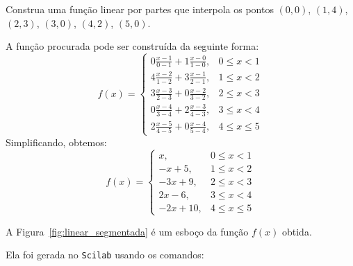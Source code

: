 \begin{ex}
  Construa uma função linear por partes que interpola os pontos $(0,0)$, $(1,4)$, $(2,3)$, $(3,0)$, $(4,2)$, $(5,0)$.

A função procurada pode ser construída da seguinte forma:
\begin{equation*}
  f(x) = \left\{
    \begin{array}{ll}
      0\frac{x-1}{0-1} + 1\frac{x-0}{1-0} ,& 0 \leq x < 1\\
      4\frac{x-2}{1-2} + 3\frac{x-1}{2-1} ,& 1 \leq x < 2\\
      3\frac{x-3}{2-3} + 0\frac{x-2}{3-2} ,& 2 \leq x < 3\\
      0\frac{x-4}{3-4} + 2\frac{x-3}{4-3} ,& 3 \leq x < 4\\
      2\frac{x-5}{4-5} + 0\frac{x-4}{5-4} ,& 4 \leq x \leq 5
    \end{array}
\right.
\end{equation*}
Simplificando, obtemos:
\begin{equation*}
  f(x) = \left\{
    \begin{array}{ll}
        x     ,& 0 \leq x < 1\\
       -x + 5 ,& 1 \leq x < 2\\
      -3x + 9 ,& 2 \leq x < 3\\
       2x - 6 ,& 3 \leq x < 4\\
      -2x +10 ,& 4 \leq x \leq 5
    \end{array}
\right.
\end{equation*}
\end{ex}

A Figura~\ref{fig:linear_segmentada} é um esboço da função $f(x)$ obtida.

\ifisscilab
Ela foi gerada no \verb+Scilab+ usando os comandos:

\fi

